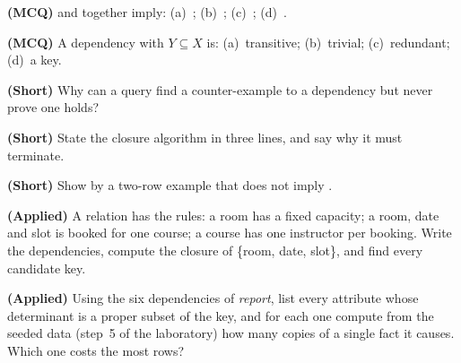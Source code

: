 \begin{reviewq}
  \item \textbf{(MCQ)}  and  together imply:
        (a)~; (b)~; (c)~; (d)~.
  \item \textbf{(MCQ)} A dependency  with $Y \subseteq X$ is:
        (a)~transitive; (b)~trivial; (c)~redundant; (d)~a key.
  \item \textbf{(Short)} Why can a query find a counter-example to a
        dependency but never prove one holds?
  \item \textbf{(Short)} State the closure algorithm in three lines, and say
        why it must terminate.
  \item \textbf{(Short)} Show by a two-row example that  does not
        imply .
  \item \textbf{(Applied)} A relation  has the rules: a room has a fixed
        capacity; a room, date and slot is booked for one course; a course has
        one instructor per booking. Write the dependencies, compute the closure
        of \{room, date, slot\}, and find every candidate key.
  \item \textbf{(Applied)} Using the six dependencies of \textit{report}, list
        every attribute whose determinant is a proper subset of the key, and for
        each one compute from the seeded data (step~5 of the laboratory) how
        many copies of a single fact it causes. Which one costs the most rows?
\end{reviewq}
